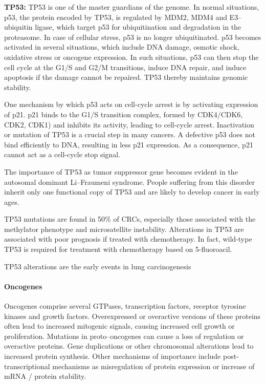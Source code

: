       \textbf{TP53:} TP53 is one of the master guardians of the genome. In
      normal situations, p53, the protein encoded by TP53, is regulated by MDM2,
      MDM4 and E3--ubiquitin ligase, which target p53 for ubiquitination and
      degradation in the proteasome. In case of cellular stress, p53 is no
      longer ubiquitinated. p53 becomes activated in several situations, which
      include  DNA damage, osmotic shock, oxidative stress or oncogene
      expression. In such situations, p53 can then stop the cell cycle at the
      G1/S and G2/M transitions, induce DNA repair, and induce apoptosis if the
      damage cannot be repaired. TP53 thereby maintains genomic stability.

      One mechanism by which p53 acts on cell-cycle arrest is by activating
      expression of p21. p21 binds to the G1/S transition complex, formed by
      CDK4/CDK6, CDK2, CDK1) and inhibits its activity, leading to cell-cycle
      arrest. Inactivation or mutation of TP53 is a crucial step in many
      cancers. A defective p53 does not bind efficiently to DNA, resulting in
      less p21 expression. As a consequence, p21 cannot act as a cell-cycle stop
      signal.

      The importance of TP53 as tumor suppressor gene becomes evident in the
      autosomal dominant Li--Fraumeni syndrome. People suffering from this disorder inherit only
      one functional copy of TP53 and are likely to develop cancer in early
      ages.

      TP53 mutations are found in 50\% of CRCs,
      especially those associated with the methylator phenotype and
      microsatellite instability. Alterations in TP53 are associated with poor
      prognosis if treated with chemotherapy. In fact, wild-type TP53 is
      required for treatment with chemotherapy based on 5-fluoroacil.

      TP53 alterations are the early events in lung carcinogenesis

      \paragraph{Oncogenes}

      Oncogenes comprise several GTPases, transcription factors, receptor tyrosine
      kinases and growth factors. Overexpressed or overactive versions of these
      proteins often lead to increased mitogenic signals, causing increased
      cell growth or proliferation. Mutations in proto--oncogenes can cause a
      loss of regulation or overactive proteins. Gene duplications or other
      chromosomal alterations lead to increased protein synthesis. Other
      mechanisms of importance include post-transcriptional mechanisms as
      misregulation of protein expression or increase of mRNA / protein stability.

